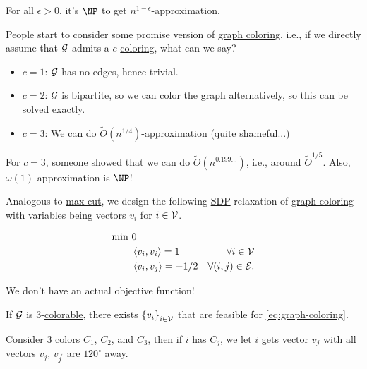 \begin{theorem}
	For all \(\epsilon > 0\), it's \(\NP\) to get \(n^{1 - \epsilon }\)-approximation.
\end{theorem}

People start to consider some promise version of \hyperref[prb:graph-coloring]{graph coloring}, i.e., if we directly assume that \(\mathcal{\MakeUppercase{g}} \) admits a \(c\)-\hyperref[def:coloring]{coloring}, what can we say?
\begin{itemize}
	\item \(c = 1\): \(\mathcal{\MakeUppercase{g}} \) has no edges, hence trivial.
	\item \(c = 2\): \(\mathcal{\MakeUppercase{g}} \) is bipartite, so we can color the graph alternatively, so this can be solved exactly.
	\item \(c = 3\): We can do \(\widetilde{O} (n^{1 / 4})\)-approximation (quite shameful...)
\end{itemize}
\begin{remark}[SOTA for \(c=3\)]
	For \(c = 3\), someone showed that we can do \(\widetilde{O} (n^{0.199\ldots  })\), i.e., around \(\widetilde{O} ^{1 / 5}\). Also, \(\omega (1)\)-approximation is \(\NP\)!
\end{remark}

Analogous to \hyperref[prb:max-cut]{max cut}, we design the following \hyperref[eq:graph-coloring]{SDP} relaxation of \hyperref[prb:graph-coloring]{graph coloring} with variables being vectors \(v_i\) for \(i\in \mathcal{\MakeUppercase{v}} \).

\begin{equation}\label{eq:graph-coloring}
	\begin{aligned}
		\min~ & 0                                                                                             \\
		      & \left\langle v_i, v_i \right\rangle = 1      & \forall i\in \mathcal{\MakeUppercase{v}}       \\
		      & \left\langle v_i, v_j \right\rangle = -1 / 2 & \forall (i, j)\in \mathcal{\MakeUppercase{e}}.
	\end{aligned}
\end{equation}

\begin{note}
	We don't have an actual objective function!
\end{note}

\begin{claim}
	If \(\mathcal{\MakeUppercase{g}} \) is \(3\)-\hyperref[def:coloring]{colorable}, there exists \(\left\{ v_i \right\}_{i\in \mathcal{\MakeUppercase{v}} } \) that are feasible for \autoref{eq:graph-coloring}.
\end{claim}
\begin{explanation}
	Consider \(3\) colors \(C_1\), \(C_2\), and \(C_3\), then if \(i\) has \(C_j\), we let \(i\) gets vector \(v_j\) with all vectors \(v_j\), \(v_{j^\prime }\) are \(120^{\circ } \) away.
	\begin{center}
	\end{center}
\end{explanation}

